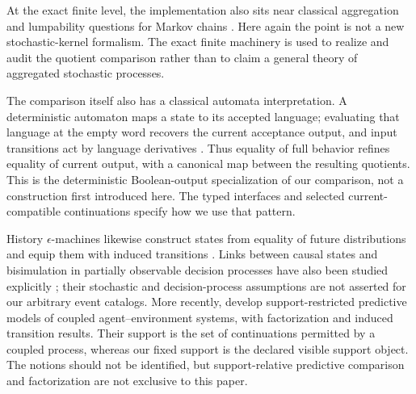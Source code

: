 \documentclass[11pt]{article}
\theoremstyle{definition}
\begin{document}
At the exact finite level, the implementation also sits near classical aggregation and lumpability questions for Markov chains \citep{KemenySnell1976FiniteMarkovChains,Norris1998MarkovChains,Buchholz1994ExactOrdinaryLumpability}. Here again the point is not a new stochastic-kernel formalism. The exact finite machinery is used to realize and audit the quotient comparison rather than to claim a general theory of aggregated stochastic processes.

The comparison itself also has a classical automata interpretation. A deterministic automaton maps a state to its accepted language; evaluating that language at the empty word recovers the current acceptance output, and input transitions act by language derivatives \citep{SilvaEtAl2013GeneralizingDeterminization}. Thus equality of full behavior refines equality of current output, with a canonical map between the resulting quotients. This is the deterministic Boolean-output specialization of our comparison, not a construction first introduced here. The typed interfaces and selected current-compatible continuations specify how we use that pattern.

History $\epsilon$-machines likewise construct states from equality of future distributions and equip them with induced transitions \citep{TraversCrutchfield2011Equivalence}. Links between causal states and bisimulation in partially observable decision processes have also been studied explicitly \citep{ZhangEtAl2019CausalStates}; their stochastic and decision-process assumptions are not asserted for our arbitrary event catalogs. More recently, \citet{BaltieriEtAl2026WorldModels} develop support-restricted predictive models of coupled agent--environment systems, with factorization and induced transition results. Their support is the set of continuations permitted by a coupled process, whereas our fixed support is the declared visible support object. The notions should not be identified, but support-relative predictive comparison and factorization are not exclusive to this paper.
\end{document}
